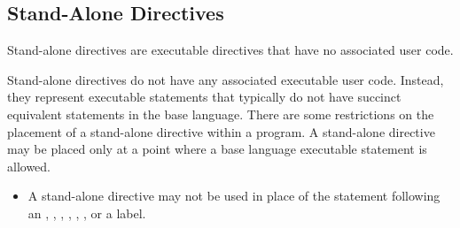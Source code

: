 \subsection{Stand-Alone Directives}
\label{subsec:Stand-Alone Directives}

\summary
Stand-alone directives are executable directives that have no associated user code.

\descr
Stand-alone directives do not have any associated executable user code. Instead, 
they represent executable statements that typically do not have succinct equivalent 
statements in the base language. There are some restrictions on the placement of a 
stand-alone directive within a program. A stand-alone directive may be placed only 
at a point where a base language executable statement is allowed.

\begin{ccppspecific}
\restrictions
\begin{itemize}
\item A stand-alone directive may not be used in place of the statement following
      an , , , , , ,
      or a label.
\end{itemize}
\end{ccppspecific}



